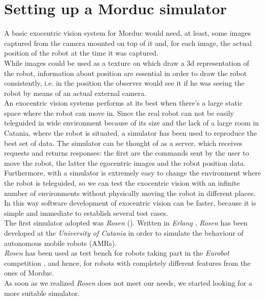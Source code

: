 \setcounter{figure}{0}
\setcounter{table}{0}
\setcounter{lstlisting}{0}

\chapter{Setting up a Morduc simulator}
\label{simulator}
\minitoc

A basic exocentric vision system for Morduc would need, 
at least, some images captured from the camera mounted 
on top of it and, for each image, the actual position of 
the robot at the time it was captured.
\\
While images could be used as a texture on which draw 
a 3d representation of the robot, information about 
position are essential in order to draw the robot 
consistently, i.e. in the position the observer would 
see it if he was seeing the robot by means of an actual 
external camera.
\\
An exocentric vision systems performs at its best 
when there's a large static space where the robot can move in. Since 
the real robot can not be easily teleguided in wide 
environment because of its size and the lack of a large 
room in Catania, where the robot is situated, a simulator 
has been used to reproduce the best set of data. The 
simulator can be thought of as a server, which receives 
requests and returns responses: the first are the commands 
sent by the user to move the robot, the latter the 
egocentric images and the robot position data.
\\
Furthermore, with a simulator is extremely easy to 
change the environment where the robot is teleguided, 
so we can test the exocentric vision with an infinite 
number of environments without physically moving the 
robot in different places. In this way software 
development of exocentric vision can be faster, because 
it is simple and immediate to establish several test cases.
\\
The first simulator adopted was \textit{Rosen} (\cite{rosen}). Written in 
\textit{Erlang} \cite{erlang}, \textit{Rosen} has been developed at
the \textit{University of Catania} in order to simulate the behaviour of
autonomous mobile robots (AMRs).
\\
\textit{Rosen} has been used as test bench for robots taking part in 
the \textit{Eurobot} competition \cite{eurobot}, and hence, 
for robots with completely different features from the ones of Morduc. 
\\
As soon as we realized \textit{Rosen} does not meet our needs, 
we started looking for a more suitable simulator.
